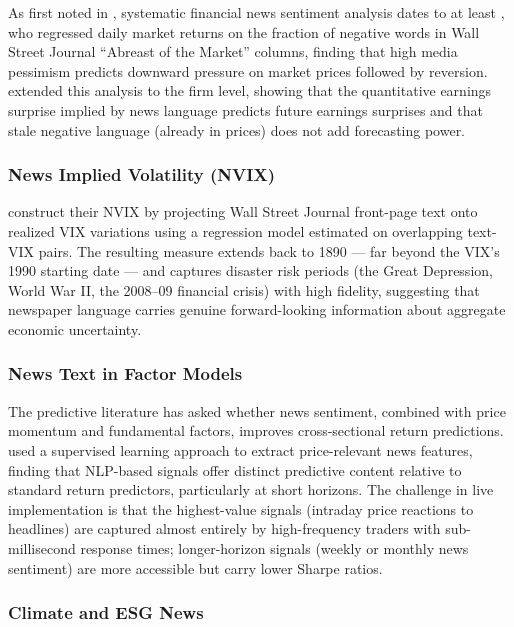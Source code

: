 As first noted in , systematic financial news sentiment analysis dates to at least \citet{tetlock2007giving}, who regressed daily market returns on the fraction of negative words in Wall Street Journal ``Abreast of the Market'' columns, finding that high media pessimism predicts downward pressure on market prices followed by reversion. \citet{tetlock2008words} extended this analysis to the firm level, showing that the quantitative earnings surprise implied by news language predicts future earnings surprises and that stale negative language (already in prices) does not add forecasting power.

\subsubsection*{News Implied Volatility (NVIX)}

\citet{manela2017news} construct their NVIX by projecting Wall Street Journal front-page text onto realized VIX variations using a regression model estimated on overlapping text-VIX pairs. The resulting measure extends back to 1890 --- far beyond the VIX's 1990 starting date --- and captures disaster risk periods (the Great Depression, World War II, the 2008--09 financial crisis) with high fidelity, suggesting that newspaper language carries genuine forward-looking information about aggregate economic uncertainty.

\subsubsection*{News Text in Factor Models}

The predictive literature has asked whether news sentiment, combined with price momentum and fundamental factors, improves cross-sectional return predictions. \citet{ke2019predicting} used a supervised learning approach to extract price-relevant news features, finding that NLP-based signals offer distinct predictive content relative to standard return predictors, particularly at short horizons. The challenge in live implementation is that the highest-value signals (intraday price reactions to headlines) are captured almost entirely by high-frequency traders with sub-millisecond response times; longer-horizon signals (weekly or monthly news sentiment) are more accessible but carry lower Sharpe ratios.

\subsubsection*{Climate and ESG News}

